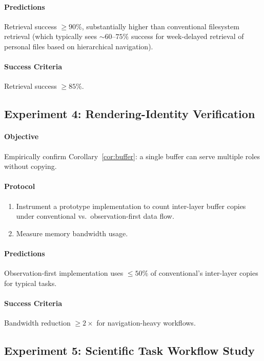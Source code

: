 \documentclass[11pt,a4paper]{article}
\theoremstyle{definition}
\theoremstyle{remark}
\begin{document}
\paragraph{Predictions}
Retrieval success $\geq 90\%$, substantially higher than conventional filesystem retrieval (which typically sees $\sim 60$--$75\%$ success for week-delayed retrieval of personal files based on hierarchical navigation).

\paragraph{Success Criteria}
Retrieval success $\geq 85\%$.

\subsection{Experiment 4: Rendering-Identity Verification}

\paragraph{Objective} Empirically confirm Corollary~\ref{cor:buffer}: a single buffer can serve multiple roles without copying.

\paragraph{Protocol}
\begin{enumerate}
    \item Instrument a prototype implementation to count inter-layer buffer copies under conventional vs.\ observation-first data flow.
    \item Measure memory bandwidth usage.
\end{enumerate}

\paragraph{Predictions}
Observation-first implementation uses $\leq 50\%$ of conventional's inter-layer copies for typical tasks.

\paragraph{Success Criteria}
Bandwidth reduction $\geq 2\times$ for navigation-heavy workflows.

\subsection{Experiment 5: Scientific Task Workflow Study}
\end{document}
